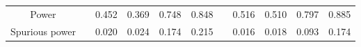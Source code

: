 % 
\begin{tabular}{ccccccccccc}
  \hline
  \hline
Power &  & 0.452 & 0.369 & 0.748 & 0.848 &  & 0.516 & 0.510 & 0.797 & 0.885 \\ 
  Spurious power &  & 0.020 & 0.024 & 0.174 & 0.215 &  & 0.016 & 0.018 & 0.093 & 0.174 \\ 
   \hline
\end{tabular}
